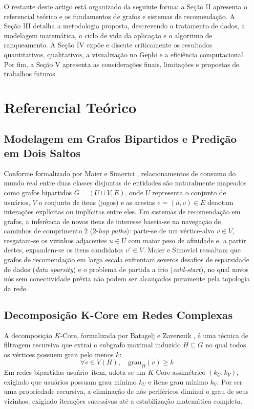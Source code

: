 \documentclass[conference]{IEEEtran}
\begin{document}
O restante deste artigo está organizado da seguinte forma: a Seção II apresenta o referencial teórico e os fundamentos de grafos e sistemas de recomendação. A Seção III detalha a metodologia proposta, descrevendo o tratamento de dados, a modelagem matemática, o ciclo de vida da aplicação e o algoritmo de ranqueamento. A Seção IV expõe e discute criticamente os resultados quantitativos, qualitativos, a visualização no Gephi e a eficiência computacional. Por fim, a Seção V apresenta as considerações finais, limitações e propostas de trabalhos futuros.

\section{Referencial Teórico}

\subsection{Modelagem em Grafos Bipartidos e Predição em Dois Saltos}
Conforme formalizado por Maier e Simovici \cite{maier2022}, relacionamentos de consumo do mundo real entre duas classes disjuntas de entidades são naturalmente mapeados como grafos bipartidos $G = (U \cup V, E)$, onde $U$ representa o conjunto de usuários, $V$ o conjunto de itens (jogos) e as arestas $e = (u, v) \in E$ denotam interações explícitas ou implícitas entre eles. Em sistemas de recomendação em grafos, a inferência de novos itens de interesse baseia-se na navegação de caminhos de comprimento 2 (2-\textit{hop paths}): parte-se de um vértice-alvo $v \in V$, resgatam-se os vizinhos adjacentes $u \in U$ com maior peso de afinidade e, a partir destes, expandem-se os itens candidatos $v' \in V$. Maier e Simovici ressaltam que grafos de recomendação em larga escala enfrentam severos desafios de esparsidade de dados (\textit{data sparsity}) e o problema de partida a frio (\textit{cold-start}), no qual novos nós sem conectividade prévia não podem ser alcançados puramente pela topologia da rede.

\subsection{Decomposição K-Core em Redes Complexas}
A decomposição $K$-Core, formalizada por Batagelj e Zaversnik \cite{batagelj2003}, é uma técnica de filtragem recursiva que extrai o subgrafo maximal induzido $H \subseteq G$ no qual todos os vértices possuem grau pelo menos $k$:
\begin{equation}
\forall v \in V(H), \quad \text{grau}_H(v) \ge k
\end{equation}
Em redes bipartidas usuário--item, adota-se um $K$-Core assimétrico $(k_U, k_V)$, exigindo que usuários possuam grau mínimo $k_U$ e itens grau mínimo $k_V$. Por ser uma propriedade recursiva, a eliminação de nós periféricos diminui o grau de seus vizinhos, exigindo iterações sucessivas até a estabilização matemática completa.
\end{document}
